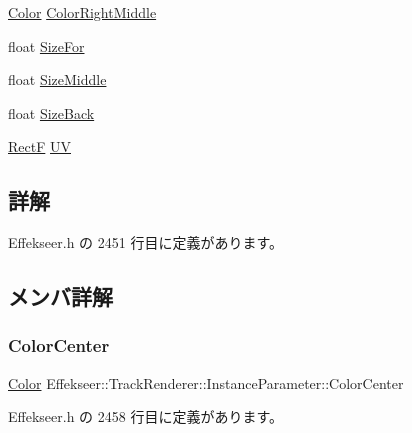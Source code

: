 \begin{DoxyCompactItemize}
\item 
\mbox{\hyperlink{struct_effekseer_1_1_color}{Color}} \mbox{\hyperlink{struct_effekseer_1_1_track_renderer_1_1_instance_parameter_a2b2a8d82514dde16ea95aa92a7533d1a}{Color\+Right\+Middle}}
\item 
float \mbox{\hyperlink{struct_effekseer_1_1_track_renderer_1_1_instance_parameter_a419cc8b0ea90c255db6a2892123b55ab}{Size\+For}}
\item 
float \mbox{\hyperlink{struct_effekseer_1_1_track_renderer_1_1_instance_parameter_a0477fd7ea1408c353ed1eeb9db7cfbb7}{Size\+Middle}}
\item 
float \mbox{\hyperlink{struct_effekseer_1_1_track_renderer_1_1_instance_parameter_a6fd93480b3976a53663430bd801af294}{Size\+Back}}
\item 
\mbox{\hyperlink{struct_effekseer_1_1_rect_f}{RectF}} \mbox{\hyperlink{struct_effekseer_1_1_track_renderer_1_1_instance_parameter_af468b7ab57e170535ef8952a5a1a1e17}{UV}}
\end{DoxyCompactItemize}


\subsection{詳解}


 Effekseer.\+h の 2451 行目に定義があります。



\subsection{メンバ詳解}
\mbox{\label{struct_effekseer_1_1_track_renderer_1_1_instance_parameter_a6aec16fb81faff1c49ff32c6c2e52a84}} 
\subsubsection{\texorpdfstring{Color\+Center}{ColorCenter}}
{\footnotesize\ttfamily \mbox{\hyperlink{struct_effekseer_1_1_color}{Color}} Effekseer\+::\+Track\+Renderer\+::\+Instance\+Parameter\+::\+Color\+Center}



 Effekseer.\+h の 2458 行目に定義があります。

